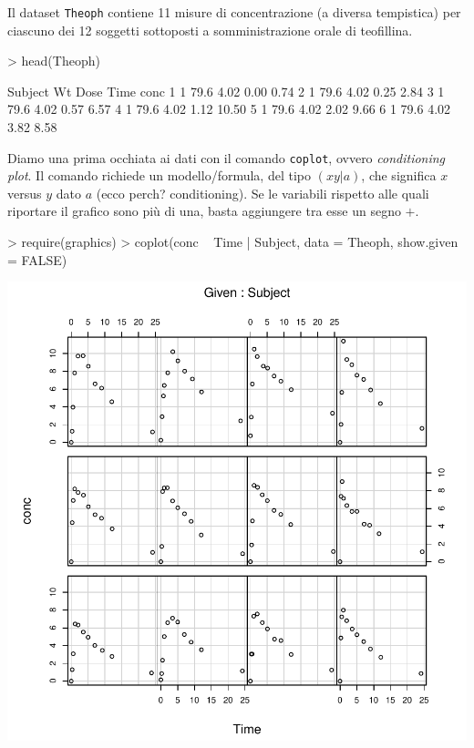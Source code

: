 \documentclass[onecolumn,11pt]{book}
\begin{document}
Il dataset \texttt{Theoph} contiene 11 misure di concentrazione (a diversa tempistica) per ciascuno dei 12 soggetti sottoposti a somministrazione orale di teofillina.
\begin{Schunk}
\begin{Sinput}
> head(Theoph)
\end{Sinput}
\begin{Soutput}
  Subject   Wt Dose Time  conc
1       1 79.6 4.02 0.00  0.74
2       1 79.6 4.02 0.25  2.84
3       1 79.6 4.02 0.57  6.57
4       1 79.6 4.02 1.12 10.50
5       1 79.6 4.02 2.02  9.66
6       1 79.6 4.02 3.82  8.58
\end{Soutput}
\end{Schunk}
Diamo una prima occhiata ai dati con il comando \texttt{coplot}, ovvero {\it conditioning plot}.  Il comando richiede un modello/formula, del tipo $(x y|a)$, che significa $x$ versus $y$ dato $a$ (ecco perch? conditioning). Se le variabili rispetto alle quali riportare il grafico sono pi\`u di una, basta aggiungere tra esse un segno $+$.
\begin{Schunk}
\begin{Sinput}
> require(graphics)
> coplot(conc ~ Time | Subject, data = Theoph, show.given = FALSE)
\end{Sinput}
\end{Schunk}
\includegraphics{statisticaconR-317}
\end{document}
